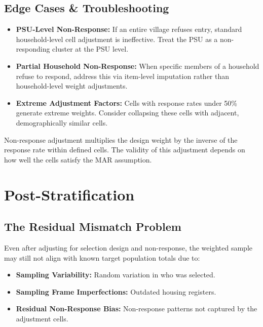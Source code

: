 \documentclass[11pt,a4paper]{article}
\begin{document}
\subsection{Edge Cases \& Troubleshooting}
\begin{itemize}
  \item \textbf{PSU-Level Non-Response:} If an entire village refuses entry, standard household-level cell adjustment is ineffective. Treat the PSU as a non-responding cluster at the PSU level.
  \item \textbf{Partial Household Non-Response:} When specific members of a household refuse to respond, address this via item-level imputation rather than household-level weight adjustments.
  \item \textbf{Extreme Adjustment Factors:} Cells with response rates under 50\% generate extreme weights. Consider collapsing these cells with adjacent, demographically similar cells.
\end{itemize}

\begin{keytakeaway}
Non-response adjustment multiplies the design weight by the inverse of the response rate within defined cells. The validity of this adjustment depends on how well the cells satisfy the MAR assumption.
\end{keytakeaway}

\newpage

\section{Post-Stratification}

\subsection{The Residual Mismatch Problem}
Even after adjusting for selection design and non-response, the weighted sample may still not align with known target population totals due to:
\begin{itemize}
  \item \textbf{Sampling Variability:} Random variation in who was selected.
  \item \textbf{Sampling Frame Imperfections:} Outdated housing registers.
  \item \textbf{Residual Non-Response Bias:} Non-response patterns not captured by the adjustment cells.
\end{itemize}
\end{document}
